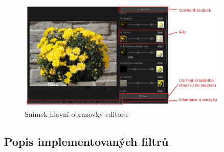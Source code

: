 \documentclass[11pt, a4paper, titlepage]{article}
\begin{document}
\begin{figure}
    \centering
    \includegraphics[width=0.9\textwidth]{screenshot.png}
    \caption{Snímek hlavní obrazovky editoru}
    \label{fig:screenshot}
\end{figure}

\subsection{Popis implementovaných filtrů}
\end{document}
